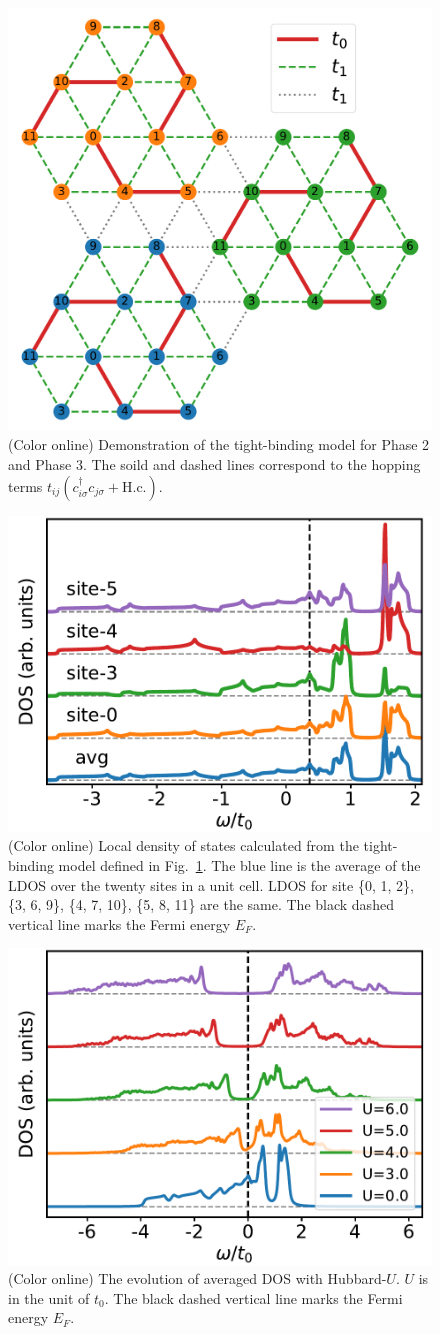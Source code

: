 \documentclass[aps,prb,amsfonts,amsmath,amssymb,showpacs,groupedaddress,superscriptaddress]{revtex4-1}
\begin{document}
\begin{figure}[p]
    \includegraphics[width=0.5\columnwidth]{fig/ModelForPhase2andPhase3.pdf}
    \caption{\label{fig:ModelForPhase2andPhase3} (Color online) Demonstration of the tight-binding model for Phase 2 and Phase 3. The soild and dashed lines correspond to the hopping terms $t_{ij} (c_{i\sigma}^{\dagger} c_{j\sigma} + \text{H.c.})$.}
\end{figure}

\begin{figure}[p]
    \includegraphics[width=0.5\columnwidth]{fig/TBAForPhase2AndPhase3.pdf}
    \caption{\label{fig:TBAForPhase2AndPhase3} (Color online) Local density of states calculated from the tight-binding model defined in Fig.~\ref{fig:ModelForPhase2andPhase3}. The blue line is the average of the LDOS over the twenty sites in a unit cell. LDOS for site \{0, 1, 2\}, \{3, 6, 9\}, \{4, 7, 10\}, \{5, 8, 11\} are the same. The black dashed vertical line marks the Fermi energy $E_{F}$.}
\end{figure}

\begin{figure}[p]
    \includegraphics[width=0.5\columnwidth]{fig/CPTForPhase2andPhase3.pdf}
    \caption{\label{fig:CPTForPhase2andPhase3} (Color online) The evolution of averaged DOS with Hubbard-$U$. $U$ is in the unit of $t_{0}$. The black dashed vertical line marks the Fermi energy $E_{F}$.}
\end{figure}
\end{document}
